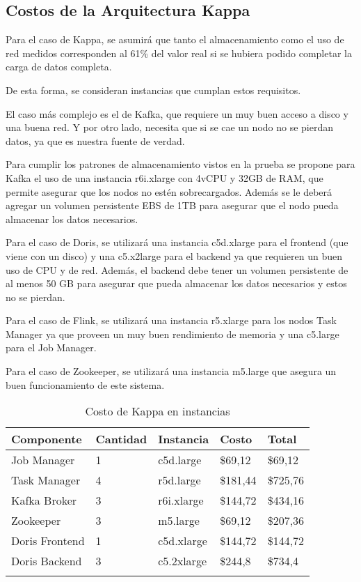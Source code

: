 \newpage
\subsection{Costos de la Arquitectura Kappa}

Para el caso de Kappa, se asumirá que tanto el almacenamiento como el uso de red medidos corresponden al 61\% del valor real si se hubiera podido completar la carga de datos completa.\newline

De esta forma, se consideran instancias que cumplan estos requisitos. 

El caso más complejo es el de Kafka, que requiere un muy buen acceso a disco y una buena red. Y por otro lado, necesita que si se cae un nodo no se pierdan datos, ya que es nuestra fuente de verdad. \newline

Para cumplir los patrones de almacenamiento vistos en la prueba se propone para Kafka el uso de una instancia r6i.xlarge con 4vCPU y 32GB de RAM,
 que permite asegurar que los nodos no estén sobrecargados. Además se le deberá agregar un volumen persistente EBS de 1TB para asegurar que el nodo pueda almacenar los datos necesarios.\newline

Para el caso de Doris, se utilizará una instancia c5d.xlarge para el frontend (que viene con un disco) y una c5.x2large para el backend ya que requieren un buen uso de CPU y de red. 
Además, el backend debe tener un volumen persistente de al menos 50 GB para asegurar que pueda almacenar los datos necesarios y estos no se pierdan. \newline

Para el caso de Flink, se utilizará una instancia r5.xlarge para los nodos Task Manager  ya que proveen un muy buen rendimiento de memoria y una c5.large para el Job Manager. \newline

Para el caso de Zookeeper, se utilizará una instancia m5.large que asegura un buen funcionamiento de este sistema.  

\newpage

\begin{longtable}{|p{3cm}|p{2cm}|p{2cm}|p{2cm}|p{3cm}|}
    \hline
    \textbf{Componente} & \textbf{Cantidad} & \textbf{Instancia} & \textbf{Costo} & \textbf{Total} \\
    \hline
    Job Manager & 1 & c5d.large & \$69,12 & \$69,12 \\
    \hline
    Task Manager & 4 & r5d.large & \$181,44 & \$725,76 \\
    \hline
    Kafka Broker & 3 & r6i.xlarge & \$144,72 & \$434,16 \\
    \hline
    Zookeeper & 3 & m5.large & \$69,12 & \$207,36 \\
    \hline
    Doris Frontend & 1 & c5d.xlarge & \$144,72 & \$144,72 \\
    \hline
    Doris Backend & 3 & c5.2xlarge & \$244,8 & \$734,4 \\
    \hline
    \caption{Costo de Kappa en instancias} \\
\end{longtable}

